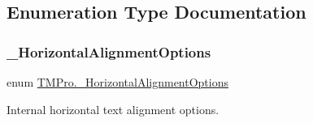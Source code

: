 \subsection{Enumeration Type Documentation}
\mbox{\label{namespace_t_m_pro_a79f7a2a68b3f84bfa58703520cbf4398}} 
\subsubsection{\texorpdfstring{\_HorizontalAlignmentOptions}{\_HorizontalAlignmentOptions}}
{\footnotesize\ttfamily enum \mbox{\hyperlink{namespace_t_m_pro_a79f7a2a68b3f84bfa58703520cbf4398}{T\+M\+Pro.\+\_\+\+Horizontal\+Alignment\+Options}}\hspace{0.3cm}{\ttfamily [strong]}}



Internal horizontal text alignment options. 

